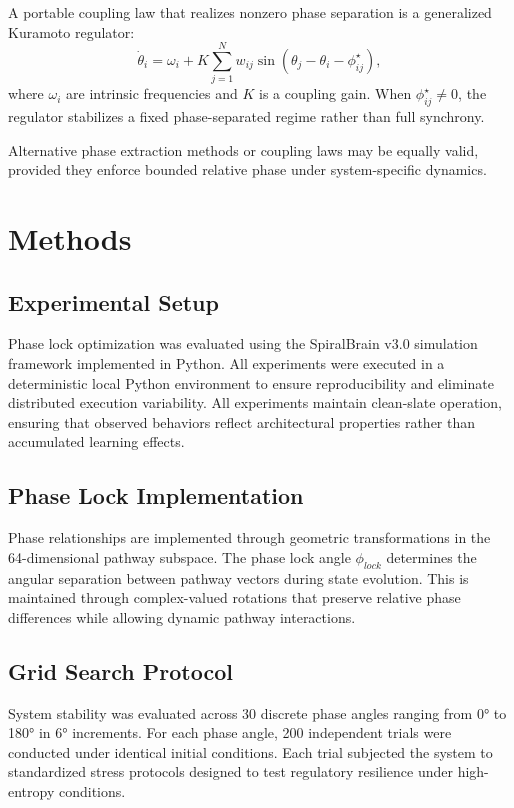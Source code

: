 \documentclass[12pt,a4paper]{report}
\begin{document}
A portable coupling law that realizes nonzero phase separation is a generalized Kuramoto regulator:
\[
\dot{\theta}_i = \omega_i + K\sum_{j=1}^N w_{ij}\sin(\theta_j-\theta_i-\phi^\star_{ij}),
\]
where $\omega_i$ are intrinsic frequencies and $K$ is a coupling gain. When $\phi^\star_{ij}\neq 0$,
the regulator stabilizes a fixed phase-separated regime rather than full synchrony.

Alternative phase extraction methods or coupling laws may be equally valid, provided they enforce bounded relative phase under system-specific dynamics.

\section{Methods}

\subsection{Experimental Setup}

Phase lock optimization was evaluated using the SpiralBrain v3.0 simulation framework implemented in Python. All experiments were executed in a deterministic local Python environment to ensure reproducibility and eliminate distributed execution variability. All experiments maintain clean-slate operation, ensuring that observed behaviors reflect architectural properties rather than accumulated learning effects.

\subsection{Phase Lock Implementation}

Phase relationships are implemented through geometric transformations in the 64-dimensional pathway subspace. The phase lock angle $\phi_{lock}$ determines the angular separation between pathway vectors during state evolution. This is maintained through complex-valued rotations that preserve relative phase differences while allowing dynamic pathway interactions.

\subsection{Grid Search Protocol}

System stability was evaluated across 30 discrete phase angles ranging from 0° to 180° in 6° increments. For each phase angle, 200 independent trials were conducted under identical initial conditions. Each trial subjected the system to standardized stress protocols designed to test regulatory resilience under high-entropy conditions.
\end{document}
